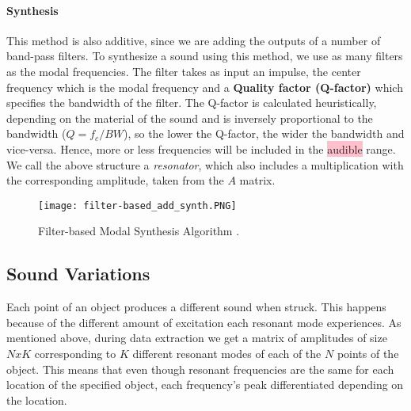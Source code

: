 \paragraph{Synthesis\\}\label{par:synth}

This method is also additive, since we are adding the outputs of a number of band-pass filters. To synthesize a sound using this method, we use as many filters as the modal frequencies. The filter takes as input an impulse, the center frequency which is the modal frequency and a \textbf{Quality factor (Q-factor)} which specifies the bandwidth of the filter. The Q-factor is calculated heuristically, depending on the material of the sound and is inversely proportional to the bandwidth ($Q=f_c/BW$), so the lower the Q-factor, the wider the bandwidth and vice-versa. Hence, more or less frequencies will be included in the \colorbox{pink}{audible} range. We call the above structure a \textit{resonator}, which also includes a multiplication with the corresponding amplitude, taken from the $A$ matrix.

\begin{figure}[H]
  \centering
    \texttt{[image: filter-based\_add\_synth.PNG]}
      \caption{Filter-based Modal Synthesis Algorithm \cite{Cook:2002:RSS:515316}.}
      \label{fig:filter_synth}
\end{figure}

\subsection{Sound Variations} \label{sec:sound_variation}
Each point of an object produces a different sound when struck. This happens because of the different amount of excitation each resonant mode experiences. As mentioned above, during data extraction we get a matrix of amplitudes of size $NxK$ corresponding to $K$ different resonant modes of each of the $N$ points of the object. This means that even though resonant frequencies are the same for each location of the specified object, each frequency's peak differentiated depending on the location.


